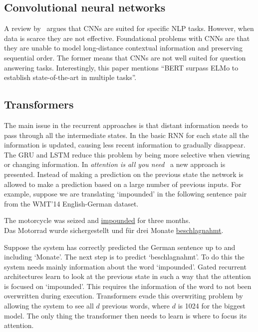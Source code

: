 \subsection{Convolutional neural networks}
\label{subsec:cnn}

A review by~\citet{young2018recent} argues that CNNs are suited for specific NLP tasks.
However, when data is scarce they are not effective.
Foundational problems with CNNs are that they are unable to model long-distance contextual information and preserving sequential order.
The former means that CNNs are not well suited for question answering tasks.
Interestingly, this paper mentions ``BERT surpass ELMo to establish state-of-the-art in multiple tasks''.

\subsection{Transformers}
\label{subsec:transformers}
The main issue in the recurrent approaches is that distant information needs to pass through all the intermediate states.
In the basic RNN for each state all the information is updated, causing less recent information to gradually disappear.
The GRU and LSTM reduce this problem by being more selective when viewing or changing information.
In \textit{attention is all you need}~\citep{vaswani2017attention} a new approach is presented.
Instead of making a prediction on the previous state the network is allowed to make a prediction based on a large number of previous inputs.
For example, suppose we are translating `impounded' in the following sentence pair from the WMT'14 English-German dataset.
\begin{center}
    The motorcycle was seized and \underline{impounded} for three months.\\[3mm]
    Das Motorrad wurde sichergestellt und f\"ur drei Monate \underline{beschlagnahmt}.
\end{center}
Suppose the system has correctly predicted the German sentence up to and including `Monate'.
The next step is to predict `beschlagnahmt'.
To do this the system needs mainly information about the word `impounded'.
Gated recurrent architectures learn to look at the previous state in such a way that the attention is focused on `impounded'.
This requires the information of the word to not been overwritten during execution.
Transformers evade this overwriting problem by allowing the system to see all $d$ previous words, where $d$ is 1024 for the biggest model.
The only thing the transformer then needs to learn is where to focus its attention.
